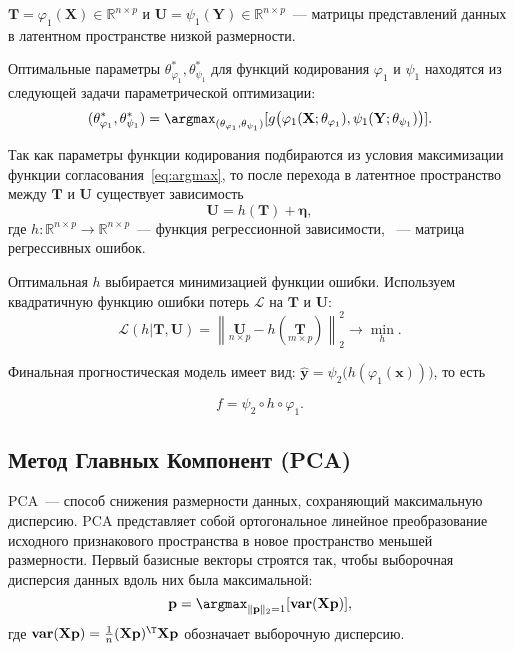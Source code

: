 \documentclass[12pt, twoside]{article}
\newcommand{\bx}{\mathbf{x}}
\newcommand{\by}{\mathbf{y}}
\newcommand{\bY}{\mathbf{Y}}
\newcommand{\bX}{\mathbf{X}}
\newcommand{\bp}{\mathbf{p}}
\newcommand{\bT}{\mathbf{T}}
\newcommand{\bU}{\mathbf{U}}
\begin{document}
\noindent $\bT = \varphi_1(\bX)  \in \mathbb{R}^{n\times p}$ и $\bU =\psi_1(\bY) \in \mathbb{R}^{n\times p}$~--- матрицы представлений данных в латентном пространстве низкой размерности.

Оптимальные параметры $\theta_{\varphi_1}^{*}, \theta_{\psi_1}^{*}$ для функций кодирования $\varphi_1$  и $\psi_1$ находятся из следующей задачи параметрической оптимизации:
\begin{equation}
(\theta_{\varphi_1}^{*}, \theta_{\psi_1}^{*}) = \argmax_{(\theta_{\varphi_1}, \theta_{\psi_1})} [g\bigl( \varphi_1(\bX; \theta_{\varphi_1}), \psi_1(\bY; \theta_{\psi_1})\bigr)].
\label{eq:argmax}
\end{equation}

Так как параметры функции кодирования подбираются из условия максимизации функции согласования~\eqref{eq:argmax}, то после перехода в латентное пространство между $\mathbf{T}$ и $\mathbf{U}$ существует зависимость
\begin{equation}
\bU = h(\bT) +  \boldsymbol{\eta},
\label{eq:reg2}
\end{equation}
где $h: \mathbb{R}^{n \times p} \to \mathbb{R}^{n \times p}$~--- функция регрессионной зависимости,  \boldsymbol{\eta}~--- матрица регрессивных ошибок.

\noindent Оптимальная $h$ выбирается минимизацией функции ошибки. Используем квадратичную функцию ошибки потерь $\mathcal{L}$ на $\bT$ и $\bU$:
\begin{equation}
\mathcal{L}(h | {\bT}, {\bU}) = {\left\| \underset{n \times p}{\bU}  - h(\underset{m \times p}{\bT}) \right\| }_2^2 \rightarrow\min_{h}.
\label{eq:loss_function}
\end{equation}

\noindent Финальная прогностическая модель имеет вид:
 $\widehat{\by} = \psi_2\bigl(h(\varphi_1(\bx))\bigr)$, то есть
 
\begin{equation}
f = \psi_2 \circ h \circ \varphi_1.
\label{eq:f}
\end{equation}

\subsection{Метод Главных Компонент (PCA)}

PCA~--- способ снижения размерности данных, сохраняющий максимальную дисперсию. PCA представляет собой ортогональное линейное преобразование исходного признакового пространства в новое пространство меньшей размерности. Первый базисные векторы строятся так, чтобы выборочная дисперсия данных вдоль них была максимальной:
\begin{equation}
\bp = \argmax_{\|\bp\|_{2} = 1} [\textbf{var}(\bX \textbf{p})],
\label{eq:PCA}
\end{equation}
где $\textbf{var}(\bX \textbf{p}) = \frac{1}{n} (\bX \textbf{p})^{\T}\bX \textbf{p}$ обозначает выборочную дисперсию.
\end{document}
